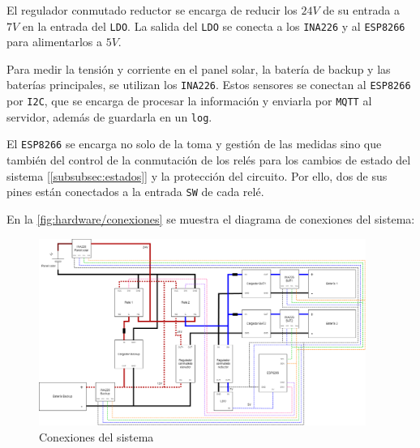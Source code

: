 El regulador conmutado reductor se encarga de reducir los $24 V$ de su entrada a $7 V$ en la entrada del \texttt{LDO}. La salida del \texttt{LDO} se conecta a los \texttt{INA226} y al \texttt{ESP8266} para alimentarlos a $5 V$.

Para medir la tensión y corriente en el panel solar, la batería de backup y las baterías principales, se utilizan los \texttt{INA226}. Estos sensores se conectan al \texttt{ESP8266} por \texttt{I2C}, que se encarga de procesar la información y enviarla por \texttt{MQTT} al servidor, además de guardarla en un \texttt{log}.

El \texttt{ESP8266} se encarga no solo de la toma y gestión de las medidas sino que también del control de la conmutación de los relés para los cambios de estado del sistema [\autoref{subsubsec:estados}] y la protección del circuito. Por ello, dos de sus pines están conectados a la entrada \texttt{SW} de cada relé.

En la \autoref{fig:hardware/conexiones} se muestra el diagrama de conexiones del sistema:

\begin{figure}[H]
    \centering
    \includegraphics[width=0.95\textwidth]{images/2-hardware/Conexiones.png}
    \caption{Conexiones del sistema}
    \label{fig:hardware/conexiones}
\end{figure}
